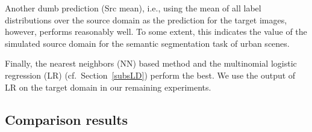 Another dumb prediction (Src mean), i.e., using the mean of  all label distributions over the source domain as the prediction for the target images, however, performs reasonably well. To some extent, this indicates the value of the simulated source domain for the semantic segmentation task of urban scenes. 

Finally, the nearest neighbors (NN) based method and the multinomial logistic regression (LR) (cf.\ Section~\ref{subsLD}) perform the best. We use the output of LR on the target domain in our remaining experiments.


\subsection{Comparison results}

\begin{table*}
    \centering
    \small
\caption{Comparison results for the semantic segmentation of the Cityscapes images~\cite{cordts_cityscapes_2016} by adapting from SYNTHIA~\cite{ros_synthia_2016}.}
\vspace{-3pt}
\label{Tresults}
\end{table*}
